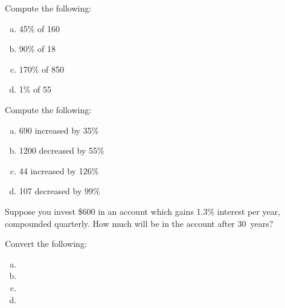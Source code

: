 \documentclass[11pt,letterpaper]{article}
\begin{document}

 Compute the following:
	\begin{enumerate}[(a)]
	\item 45\% of 160
	\item 90\% of 18
	\item 170\% of 850
	\item 1\% of 55
	\end{enumerate}



\newpage



 Compute the following:
	\begin{enumerate}[(a)]
	\item 690 increased by 35\%
	\item 1200 decreased by 55\%
	\item 44 increased by 126\%
	\item 107 decreased by 99\%
	\end{enumerate}



\newpage



 Suppose you invest \$600 in an account which gains 1.3\% interest per year, compounded quarterly. How much will be in the account after 30~years?



\newpage



 Convert the following:
	\begin{enumerate}[(a)]
	\item 
	\item 
	\item 
	\item 
	\end{enumerate}
\end{document}
